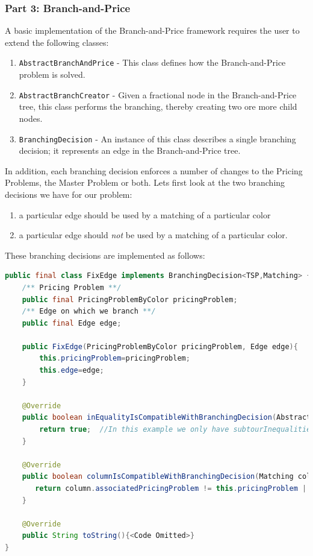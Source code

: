 \documentclass[a4paper]{article}
\newenvironment{myblock}[1]{%
    \tcolorbox[beamer,%
    noparskip,breakable,
    colback=lightBlueCodeBlock,colframe=darkBlueCodeBlock,%
    colbacklower=darkBlueCodeBlock!75!lightBlueCodeBlock,%
    coltitle=blueTitleCodeBlock,
    title=#1]}%
    {\endtcolorbox}
\newcommand{\code}[1]{\lstinline[language=java, style=seminar]!#1!}
\begin{document}
\subsubsection{Part 3: Branch-and-Price}
A basic implementation of the Branch-and-Price framework requires the user to extend the following classes:
\begin{enumerate}[nolistsep]
 \item \code{AbstractBranchAndPrice} - This class defines how the Branch-and-Price problem is solved.
 \item \code{AbstractBranchCreator} - Given a fractional node in the Branch-and-Price tree, this class performs the branching, thereby creating two ore more child nodes.
 \item \code{BranchingDecision} - An instance of this class describes a single branching decision; it represents an edge in the Branch-and-Price tree.
\end{enumerate}
In addition, each branching decision enforces a number of changes to the Pricing Problems, the Master Problem or both. 
Lets first look at the two branching decisions we have for our problem:
\begin{enumerate}
 \item a particular edge should be used by a matching of a particular color
 \item a particular edge should \emph{not} be used by a matching of a particular color.
\end{enumerate}
These branching decisions are implemented as follows:
\begin{myblock}{Branching decision 1: FixEdge}
\begin{lstlisting}[language=java, style=eclipseArticle, xleftmargin=2em]  
public final class FixEdge implements BranchingDecision<TSP,Matching> {
    /** Pricing Problem **/
    public final PricingProblemByColor pricingProblem;
    /** Edge on which we branch **/
    public final Edge edge;

    public FixEdge(PricingProblemByColor pricingProblem, Edge edge){
        this.pricingProblem=pricingProblem;
        this.edge=edge;
    }

    @Override
    public boolean inEqualityIsCompatibleWithBranchingDecision(AbstractInequality inequality) {
        return true;  //In this example we only have subtourInequalities. They remain valid, independent of whether we fix an edge.
    }

    @Override
    public boolean columnIsCompatibleWithBranchingDecision(Matching column) {
       return column.associatedPricingProblem != this.pricingProblem || column.edges.contains(edge);
    }

    @Override
    public String toString(){<Code Omitted>}
}
\end{lstlisting}
\end{myblock}
\end{document}
